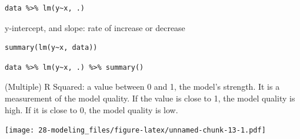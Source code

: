 \documentclass[
  xelatex, ja=standard]{bxjsbook}
\theoremstyle{definition}
\theoremstyle{definition}
\theoremstyle{definition}
\theoremstyle{definition}
\theoremstyle{remark}
\begin{document}
\begin{verbatim}
data %>% lm(y~x, .)
\end{verbatim}

y-intercept, and slope: rate of increase or decrease

\begin{verbatim}
summary(lm(y~x, data))
\end{verbatim}

\begin{verbatim}
data %>% lm(y~x, .) %>% summary()
\end{verbatim}

(Multiple) R Squared: a value between 0 and 1, the model's strength. It is a measurement of the model quality. If the value is close to 1, the model quality is high. If it is close to 0, the model quality is low.

\texttt{[image: 28-modeling\_files/figure-latex/unnamed-chunk-13-1.pdf]}
\end{document}

